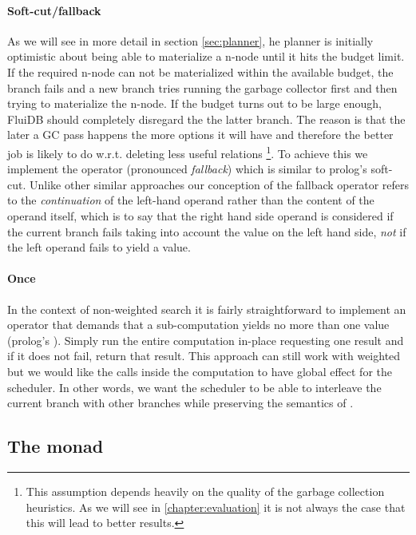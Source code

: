 \paragraph{Soft-cut/fallback}
As we will see in more detail in section \ref{sec:planner}, he planner is
initially optimistic about being able to materialize a n-node until it
hits the budget limit. If the required n-node can not be materialized within the
available budget, the branch fails and a new branch tries running the
garbage collector first and then trying to materialize the n-node.  If
the budget turns out to be large enough, FluiDB should completely
disregard the the latter branch.  The reason is that the later a GC
pass happens the more options it will have and therefore the better
job is likely to do w.r.t. deleting less useful relations \footnote{This assumption depends heavily on the quality of the garbage collection heuristics. As we will see in \ref{chapter:evaluation} it is not always the case that this will lead to better results.}. To achieve
this we implement the operator \hask{<//>} (pronounced
\emph{fallback}) which is similar to prolog's soft-cut. Unlike other
similar approaches our conception of the fallback
operator refers to the \emph{continuation} of the left-hand operand
rather than the content of the operand itself, which is to say that the right hand side operand
is considered if the current branch fails taking into account
the value on the left hand side, \emph{not} if the left operand fails
to yield a value.

\paragraph{Once}
In the context of non-weighted search it is fairly
straightforward to implement an operator that demands that a sub-computation yields no more than
one value (prolog's ). Simply run the entire computation
in-place requesting one result and if it does not fail, return that
result. This approach can still work with weighted but we would like
the  calls inside the computation to have global effect for the
scheduler. In other words, we want the scheduler to be able to
interleave the current branch with other branches while preserving the
semantics of .


\subsection{The  monad}
\label{sec:cntt_monad}

